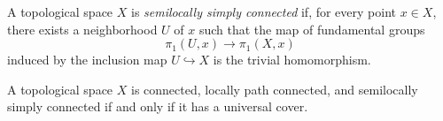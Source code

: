 \documentclass[12pt]{article}
\begin{document}
A topological space $X$ is {\em semilocally simply connected} if, for every point $x \in X$, there exists a neighborhood $U$ of $x$ such that the map of fundamental groups
$$
\pi_1(U,x) \longrightarrow \pi_1(X,x)
$$
induced by the inclusion map $U \hookrightarrow X$ is the trivial homomorphism.

A topological space $X$ is connected, locally path connected, and semilocally simply connected if and only if it has a universal cover.
\end{document}
